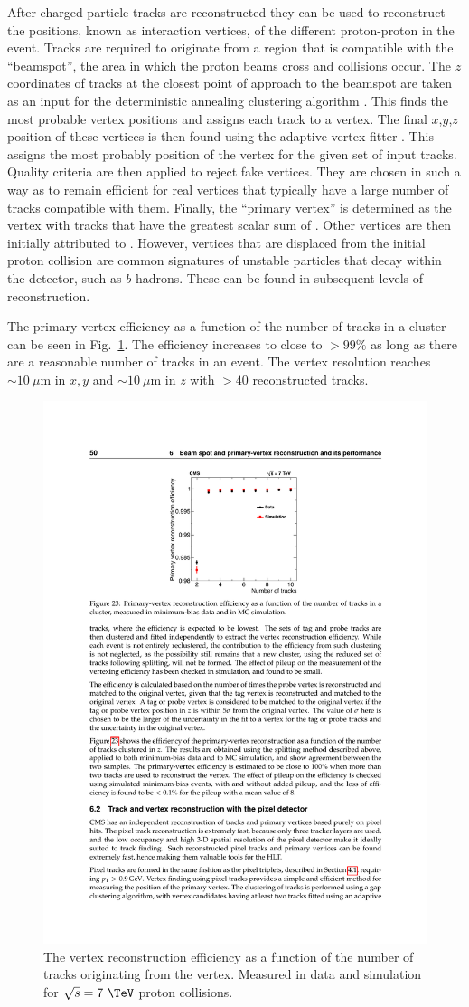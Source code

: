 After charged particle tracks are reconstructed they can be used to
reconstruct the positions, known as interaction vertices, of the different
proton-proton in the event. Tracks are required to originate from a
region that is compatible with the \LHC ``beamspot'', the area in
which the proton beams cross and collisions occur. The $z$ coordinates
of tracks at the closest point of approach to the beamspot are taken
as an input for the deterministic annealing clustering algorithm
\cite{726788:DA}. This finds the most probable vertex positions and
assigns each track to a vertex. The final $x$,$y$,$z$ position of
these vertices is then found using the adaptive vertex fitter 
\cite{Waltenberger:2008zz}. This assigns the most probably position of
the vertex for the given set of input tracks. Quality criteria are
then applied to reject fake vertices. They are chosen in such a way as
to remain efficient for real vertices that typically have a large
number of tracks compatible with them. Finally, the ``primary vertex''
is determined as the vertex with tracks that have the greatest scalar
sum of \pt. Other vertices are then initially attributed to \PU.
However, vertices that are displaced from the initial proton collision
are common signatures of unstable particles that decay within the
detector, such as $b$-hadrons. These can be found in subsequent levels
of reconstruction.

The primary vertex efficiency as a function of the number of tracks in
a cluster can be seen in Fig.~\ref{fig:vertex_reco}. The efficiency increases to
close to $>99\%$ as long as there are a reasonable number of tracks in
an event. The vertex resolution reaches $\sim10~\mu$m in $x,y$ and
$\sim10~\mu$m in $z$ with $>40$ reconstructed tracks.

\begin{figure}
\begin{center}
\includegraphics[width=0.5\linewidth]{figs/reconstruction/vertexPerformance} \end{center}
\caption{ The vertex reconstruction efficiency as a function of the
number of tracks originating from the vertex. Measured in data and
simulation for $\sqrt{s}=7~\tev$ proton collisions.
\cite{Chatrchyan:2014fea}}
\label{fig:vertex_reco} \end{figure}


